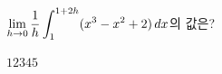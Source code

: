 $\displaystyle\lim_{h\to 0}\dfrac{1}{h}\int_{1}^{1+2h}(x^3-x^2+2)\mkern3mu dx$의 값은?
\begin{choices32}{$1$}{$2$}{$3$}{$4$}{$5$}\end{choices32}
